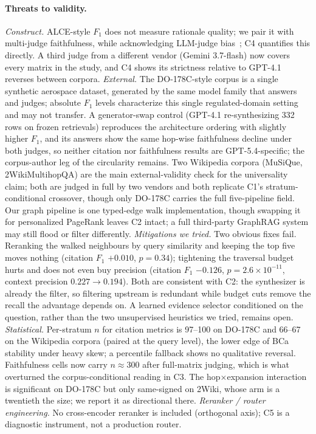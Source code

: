 \paragraph{Threats to validity.}
\textit{Construct.} ALCE-style $F_1$ does not measure rationale quality;
we pair it with multi-judge faithfulness, while acknowledging LLM-judge
bias~\cite{selfpref_bias2024,wallat2024}; C4 quantifies this directly.
A third judge from a different vendor (Gemini 3.7-flash) now covers
every matrix in the study, and C4 shows its strictness relative to
GPT-4.1 reverses between corpora.
\textit{External.} The DO-178C-style corpus is a single synthetic
aerospace dataset, generated by the same model family that answers and
judges; absolute $F_1$ levels characterize this single
regulated-domain setting and may not transfer. A generator-swap
control (GPT-4.1 re-synthesizing 332 rows on frozen retrievals)
reproduces the architecture ordering with slightly higher $F_1$, and
its answers show the same hop-wise faithfulness decline under both
judges, so neither citation nor faithfulness results are
GPT-5.4-specific; the corpus-author leg of the circularity remains. Two Wikipedia corpora (MuSiQue, 2WikiMultihopQA) are the main
external-validity check for the universality claim; both are judged in
full by two vendors and both replicate C1's stratum-conditional
crossover, though only DO-178C carries the full five-pipeline field. Our graph pipeline
is one typed-edge walk implementation, though swapping it for
personalized PageRank leaves C2 intact; a full third-party GraphRAG
system may still flood or filter differently.
\textit{Mitigations we tried.} Two obvious fixes fail. Reranking the
walked neighbours by query similarity and keeping the top five moves
nothing (citation $F_1$ $+0.010$, $p{=}0.34$); tightening the traversal
budget hurts and does not even buy precision (citation $F_1$ $-0.126$,
$p{=}2.6{\times}10^{-11}$, context precision $0.227{\to}0.194$). Both
are consistent with C2: the synthesizer is already the filter, so
filtering upstream is redundant while budget cuts remove the recall the
advantage depends on. A learned evidence selector conditioned on the
question, rather than the two unsupervised heuristics we tried, remains
open.
\textit{Statistical.} Per-stratum $n$ for citation metrics is 97--100
on DO-178C and 66--67 on the Wikipedia corpora (paired at the query
level), the lower edge of BCa stability under heavy skew; a
percentile fallback shows no qualitative reversal. Faithfulness cells
now carry $n\approx300$ after full-matrix judging, which is what
overturned the corpus-conditional reading in C3. The hop$\times$expansion
interaction is significant on DO-178C but only same-signed on 2Wiki,
whose arm is a twentieth the size; we report it as directional there. \textit{Reranker / router engineering.} No cross-encoder
reranker is included (orthogonal axis); C5 is a diagnostic instrument,
not a production router.

